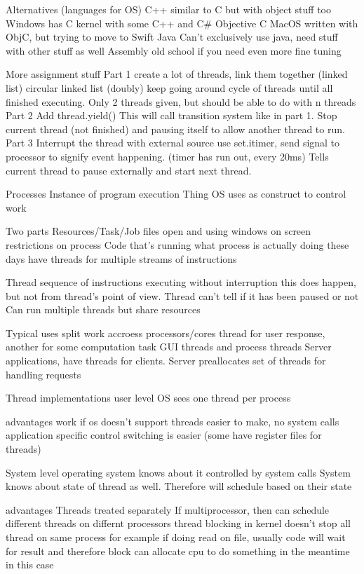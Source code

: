 \documentclass{article}
\begin{document}
	Alternatives (languages for OS)
		C++
			similar to C but with object stuff too
			Windows has C kernel with some C++ and C\#
		Objective C
			MacOS written with ObjC, but trying to move to Swift
		Java
			Can't exclusively use java, need stuff with other stuff as well
		Assembly
			old school if you need even more fine tuning

More assignment stuff
	Part 1
		create a lot of threads, link them together (linked list)
		circular linked list (doubly) 
		keep going around cycle of threads until all finished executing.
		Only 2 threads given, but should be able to do with n threads
	Part 2
		Add thread.yield()
		This will call transition system like in part 1.
		Stop current thread (not finished) and pausing itself to allow another thread to run.
	Part 3
		Interrupt the thread with external source
		use set.itimer, send signal to processor to signify event happening. (timer has run out, every 20ms)
		Tells current thread to pause externally and start next thread.

Processes
	Instance of program execution
	Thing OS uses as construct to control work

Two parts
	Resources/Task/Job
		files open and using
		windows on screen
		restrictions on process
	Code that's running
		what process is actually doing
		these days have threads for multiple streams of instructions

Thread
	sequence of instructions executing without interruption
		this does happen, but not from thread's point of view. Thread can't tell if it has been paused or not
	Can run multiple threads but share resources

Typical uses
	split work accroess processors/cores
		thread for user response, another for some computation task
		GUI threads and process threads
	Server applications, have threads for clients.
		Server preallocates set of threads for handling requests

Thread implementations
	user level	
		OS sees one thread per process

		advantages
			work if os doesn't support threads
			easier to make, no system calls
			application specific control
			switching is easier (some have register files for threads)

	System level
		operating system knows about it
		controlled by system calls
		System knows about state of thread as well. Therefore will schedule based on their state

		advantages
			Threads treated separately
			If multiprocessor, then can schedule different threads on differnt processors
			thread blocking in kernel doesn't stop all thread on same process
				for example if doing read on file, usually code will wait for result and therefore block
				can allocate cpu to do something in the meantime in this case
\end{document}
